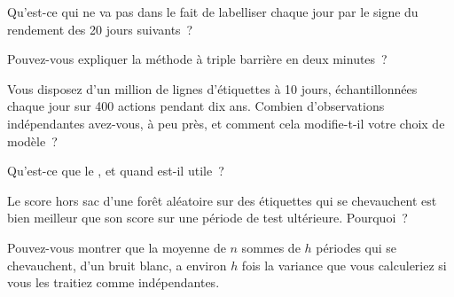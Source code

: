 \begin{interviewq}\label{iq:ml:targets-labels-and-sample-weights:1}
Qu'est-ce qui ne va pas dans le fait de labelliser chaque jour par le signe du rendement des 20 jours suivants~?
\end{interviewq}

\begin{interviewq}\label{iq:ml:targets-labels-and-sample-weights:2}
Pouvez-vous expliquer la méthode à triple barrière en deux minutes~?
\end{interviewq}

\begin{interviewq}\label{iq:ml:targets-labels-and-sample-weights:3}
Vous disposez d'un million de lignes d'étiquettes à 10 jours, échantillonnées chaque jour sur 400 actions pendant dix ans. Combien d'observations indépendantes
avez-vous, à peu près, et comment cela modifie-t-il votre choix de modèle~?
\end{interviewq}

\begin{interviewq}\label{iq:ml:targets-labels-and-sample-weights:4}
Qu'est-ce que le , et quand est-il utile~?
\end{interviewq}

\begin{interviewq}\label{iq:ml:targets-labels-and-sample-weights:5}
Le score hors sac d'une forêt aléatoire sur des étiquettes qui se chevauchent est bien meilleur que son score sur une période de test ultérieure. Pourquoi~?
\end{interviewq}

\begin{interviewq}\label{iq:ml:targets-labels-and-sample-weights:6}
Pouvez-vous montrer que la moyenne de $n$ sommes de $h$ périodes qui se chevauchent, d'un bruit blanc, a environ $h$ fois la variance que vous calculeriez
si vous les traitiez comme indépendantes.
\end{interviewq}
